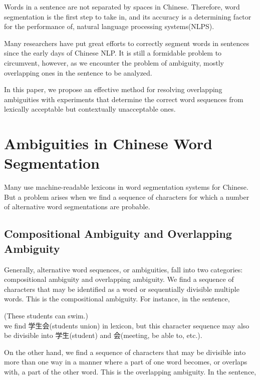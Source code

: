 Words in a sentence are not separated by spaces in Chinese.
Therefore, word segmentation is the first step to take in,
and its accuracy is a determining factor for the performance of,
natural language processing systems(NLPS).

Many researchers have put great efforts to correctly segment words
in sentences since the early days of Chinese NLP. It is still a formidable problem
to circumvent, however, as we encounter the problem of ambiguity,
mostly overlapping ones in the sentence to be analyzed.


In this paper, we propose an effective method for resolving overlapping
ambiguities with experiments that determine the correct word sequences
from lexically acceptable but contextually unacceptable ones.

\section{Ambiguities in Chinese Word Segmentation}
\label{ambig}

Many use machine-readable lexicons in word segmentation systems for Chinese.
But a problem arises when we find a sequence of characters for which a number
of alternative word segmentations are probable.

\subsection{Compositional Ambiguity and Overlapping Ambiguity}
\label{compos}

Generally, alternative word sequences, or ambiguities, fall into two categories:
compositional ambiguity and overlapping ambiguity.
We find a sequence of characters that may be identified as a word or sequentially
divisible multiple words. This is the compositional ambiguity.
For instance, in the sentence,

\hspace*{3zw}{\small 這些学生会遊泳。}  (These students can swim.)\\
we find {\small 学生会}(students union) in lexicon, but this character sequence may
also be divisible into {\small 学生}(student) and {\small 会}(meeting, be able to, etc.).

On the other hand, we find a sequence of characters that may be divisible
into more than one way in a manner where a part of one word becomes,
or overlaps with, a part of the other word. This is the overlapping ambiguity.
In the sentence,

